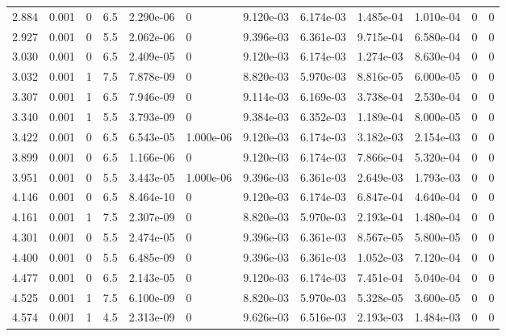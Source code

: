 \documentclass[preview]{standalone}
\begin{document}
{{\begin{tabular}{L{1.2cm}C{1.2cm} C{0.3cm}C{0.5cm} C{1.4cm}C{1.4cm} C{1.4cm}C{1.4cm} C{1.6cm}C{1.6cm} C{1.6cm}C{1.6cm}}
  2.884  &  0.001  & 0     & 6.5 &  2.290e-06  & 0  &  9.120e-03&   6.174e-03& 1.485e-04 & 1.010e-04   &  0 & 0  \\ 
  2.927  &  0.001  & 0     & 5.5 &  2.062e-06  & 0  &  9.396e-03&   6.361e-03& 9.715e-04 & 6.580e-04   &  0 & 0  \\ 
  3.030  &  0.001  & 0     & 6.5 &  2.409e-05  & 0  &  9.120e-03&   6.174e-03& 1.274e-03 & 8.630e-04   &  0 & 0  \\ 
  3.032  &  0.001  & 1     & 7.5 &  7.878e-09  & 0  &  8.820e-03&   5.970e-03& 8.816e-05 & 6.000e-05   &  0 & 0  \\ 
  3.307  &  0.001  & 1     & 6.5 &  7.946e-09  & 0  &  9.114e-03&   6.169e-03& 3.738e-04 & 2.530e-04   &  0 & 0  \\ 
  3.340  &  0.001  & 1     & 5.5 &  3.793e-09  & 0  &  9.384e-03&   6.352e-03& 1.189e-04 & 8.000e-05   &  0 & 0  \\ 
  3.422  &  0.001  & 0     & 6.5 &  6.543e-05  & 1.000e-06  &  9.120e-03&   6.174e-03& 3.182e-03 & 2.154e-03   &  0 & 0  \\ 
  3.899  &  0.001  & 0     & 6.5 &  1.166e-06  & 0  &  9.120e-03&   6.174e-03& 7.866e-04 & 5.320e-04   &  0 & 0  \\ 
  3.951  &  0.001  & 0     & 5.5 &  3.443e-05  & 1.000e-06  &  9.396e-03&   6.361e-03& 2.649e-03 & 1.793e-03   &  0 & 0  \\ 
  4.146  &  0.001  & 0     & 6.5 &  8.464e-10  & 0  &  9.120e-03&   6.174e-03& 6.847e-04 & 4.640e-04   &  0 & 0  \\ 
  4.161  &  0.001  & 1     & 7.5 &  2.307e-09  & 0  &  8.820e-03&   5.970e-03& 2.193e-04 & 1.480e-04   &  0 & 0  \\ 
  4.301  &  0.001  & 0     & 5.5 &  2.474e-05  & 0  &  9.396e-03&   6.361e-03& 8.567e-05 & 5.800e-05   &  0 & 0  \\ 
  4.400  &  0.001  & 0     & 5.5 &  6.485e-09  & 0  &  9.396e-03&   6.361e-03& 1.052e-03 & 7.120e-04   &  0 & 0  \\ 
  4.477  &  0.001  & 0     & 6.5 &  2.143e-05  & 0  &  9.120e-03&   6.174e-03& 7.451e-04 & 5.040e-04   &  0 & 0  \\ 
  4.525  &  0.001  & 1     & 7.5 &  6.100e-09  & 0  &  8.820e-03&   5.970e-03& 5.328e-05 & 3.600e-05   &  0 & 0  \\ 
  4.574  &  0.001  & 1     & 4.5 &  2.313e-09  & 0  &  9.626e-03&   6.516e-03& 2.193e-03 & 1.484e-03   &  0 & 0  \\ 
\hline 
\end{tabular} 

}}
\end{document}
